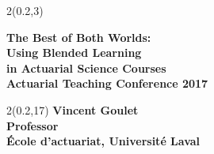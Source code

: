 \begingroup

\textblockorigin{0mm}{0mm}
\begin{frame}[plain]
  \begin{textblock*}{2\TPHorizModule}(0.2\TPHorizModule,3\TPVertModule)
    \raggedright%
    \bfseries
    \fontsize{20}{20}\selectfont
    The Best of Both Worlds: \\
    Using Blended Learning \\
    in Actuarial Science Courses \\
    \mdseries
    \fontsize{14}{18}\selectfont
    Actuarial Teaching Conference 2017
  \end{textblock*}

  \begin{textblock*}{2\TPHorizModule}(0.2\TPHorizModule,17\TPVertModule)
    \fontsize{10}{11}\selectfont
    \bfseries
    Vincent Goulet \\
    \fontsize{9}{11}\selectfont
    \mdseries
    Professor \\
    École d'actuariat, Université Laval
  \end{textblock*}
\end{frame}
\endgroup

